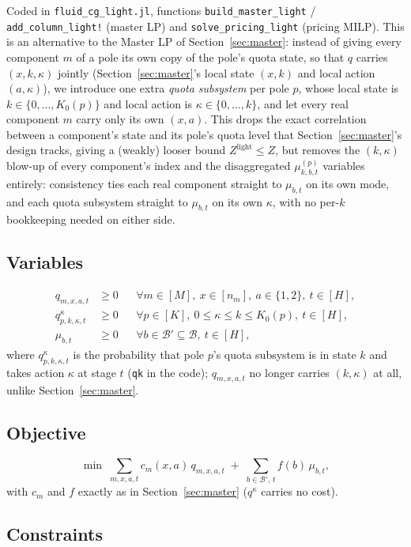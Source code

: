 \documentclass[11pt]{article}
\begin{document}
Coded in \texttt{fluid\_cg\_light.jl}, functions \texttt{build\_master\_light} /
\texttt{add\_column\_light!} (master LP) and \texttt{solve\_pricing\_light} (pricing MILP).
This is an alternative to the Master LP of Section~\ref{sec:master}: instead of giving every
component $m$ of a pole its own copy of the pole's quota state, so that $q$ carries
$(x,k,\kappa)$ jointly (Section~\ref{sec:master}'s local state $(x,k)$ and local action
$(a,\kappa)$), we introduce one extra \emph{quota subsystem} per pole $p$, whose local state
is $k \in \{0,\dots,K_0(p)\}$ and local action is $\kappa \in \{0,\dots,k\}$, and let every
real component $m$ carry only its own $(x,a)$. This drops the exact correlation between a
component's state and its pole's quota level that Section~\ref{sec:master}'s design tracks,
giving a (weakly) looser bound $Z^{\mathrm{light}} \le Z$, but removes the $(k,\kappa)$
blow-up of every component's index and the disaggregated $\mu^{(p)}_{k,b,t}$ variables
entirely: consistency ties each real component straight to $\mu_{b,t}$ on its own mode, and
each quota subsystem straight to $\mu_{b,t}$ on its own $\kappa$, with no per-$k$
bookkeeping needed on either side.

\subsection*{Variables}
\begin{align*}
  q_{m,x,a,t} &\ge 0
  &&\forall m \in [M],\ x \in [n_m],\ a \in \{1,2\},\ t \in [H], \\
  q^{\kappa}_{p,k,\kappa,t} &\ge 0
  &&\forall p \in [K],\ 0 \le \kappa \le k \le K_0(p),\ t \in [H], \\
  \mu_{b,t} &\ge 0
  &&\forall b \in \mathcal B' \subseteq \mathcal B,\ t \in [H],
\end{align*}
where $q^{\kappa}_{p,k,\kappa,t}$ is the probability that pole $p$'s quota subsystem is in
state $k$ and takes action $\kappa$ at stage $t$ (\texttt{qk} in the code); $q_{m,x,a,t}$ no
longer carries $(k,\kappa)$ at all, unlike Section~\ref{sec:master}.

\subsection*{Objective}
\[
  \min \; \sum_{m,x,a,t} c_m(x,a)\, q_{m,x,a,t}
  \;+\; \sum_{b \in \mathcal B',\,t} f(b)\, \mu_{b,t},
\]
with $c_m$ and $f$ exactly as in Section~\ref{sec:master} ($q^{\kappa}$ carries no cost).

\subsection*{Constraints}
\end{document}
